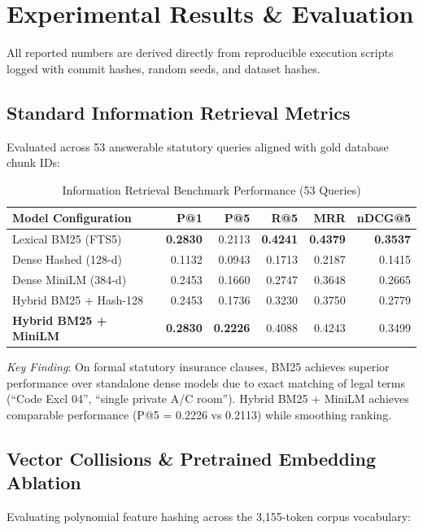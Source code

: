 \documentclass[conference]{IEEEtran}
\begin{document}
\section{Experimental Results \& Evaluation}

All reported numbers are derived directly from reproducible execution scripts logged with commit hashes, random seeds, and dataset hashes.

\subsection{Standard Information Retrieval Metrics}
Evaluated across 53 answerable statutory queries aligned with gold database chunk IDs:

\begin{table}[htbp]
\caption{Information Retrieval Benchmark Performance (53 Queries)}
\begin{center}
\begin{tabular}{lrrrrr}
\toprule
\textbf{Model Configuration} & \textbf{P@1} & \textbf{P@5} & \textbf{R@5} & \textbf{MRR} & \textbf{nDCG@5} \\
\midrule
Lexical BM25 (FTS5) & \textbf{0.2830} & 0.2113 & \textbf{0.4241} & \textbf{0.4379} & \textbf{0.3537} \\
Dense Hashed (128-d) & 0.1132 & 0.0943 & 0.1713 & 0.2187 & 0.1415 \\
Dense MiniLM (384-d) & 0.2453 & 0.1660 & 0.2747 & 0.3648 & 0.2665 \\
Hybrid BM25 + Hash-128 & 0.2453 & 0.1736 & 0.3230 & 0.3750 & 0.2779 \\
\textbf{Hybrid BM25 + MiniLM} & \textbf{0.2830} & \textbf{0.2226} & 0.4088 & 0.4243 & 0.3499 \\
\bottomrule
\end{tabular}
\end{center}
\end{table}

\textit{Key Finding}: On formal statutory insurance clauses, BM25 achieves superior performance over standalone dense models due to exact matching of legal terms (``Code Excl 04'', ``single private A/C room''). Hybrid BM25 + MiniLM achieves comparable performance (P@5 = 0.2226 vs 0.2113) while smoothing ranking.

\subsection{Vector Collisions \& Pretrained Embedding Ablation}
Evaluating polynomial feature hashing across the 3,155-token corpus vocabulary:
\end{document}
